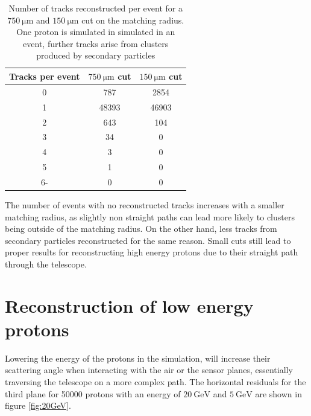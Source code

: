 \begin{table}
  \centering
  \begin{tabular}{c | c c}
    \toprule
    Tracks per event &  $\SI{750}{\micro\meter}$ cut & $\SI{150}{\micro\meter}$ cut\\
    \midrule
    0 & 787    & 2854  \\
    1 & 48393  & 46903  \\
    2 & 643    & 104  \\
    3 & 34     & 0  \\
    4 & 3      & 0   \\
    5 & 1      & 0    \\
    6- & 0 & 0 \\
  \end{tabular}
  \caption{Number of tracks reconstructed per event for a
  $\SI{750}{\micro\meter}$ and $\SI{150}{\micro\meter}$ cut on the
  matching radius. One proton is simulated in simulated in an event, further tracks arise from clusters
  produced by secondary particles}
  \label{tab:cluster_per_track}
\end{table}

The number of events with no reconstructed tracks increases with a smaller matching radius, as slightly non straight paths can lead
more likely to clusters being outside of the matching radius. On the other hand, less tracks from secondary particles reconstructed
for the same reason. Small cuts still lead to proper results
for reconstructing high energy protons due to their straight path through the telescope.



\section{Reconstruction of low energy protons}\label{sec:energy}
Lowering the energy of the protons in the simulation, will increase their scattering angle when interacting with the air or the sensor
planes, essentially traversing the telescope on a more complex path.
The horizontal residuals for the third plane for 50000 protons with an energy of $\SI{20}{\giga\eV}$ and $\SI{5}{\GeV}$ are shown in figure \ref{fig:20GeV}.

